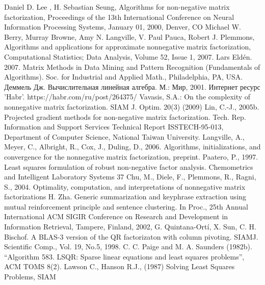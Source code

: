 \newpage
{}

\begin{thebibliography}{9}
   Daniel D. Lee , H. Sebastian Seung, Algorithms for non-negative matrix factorization, Proceedings of the 13th International Conference on Neural Information Processing Systems, January 01, 2000, Denver, CO
   Michael W. Berry, Murray Browne, Amy N. Langville, V. Paul Pauca, Robert J. Plemmons, Algorithms and applications for approximate nonnegative matrix factorization, Computational Statistics; Data Analysis, Volume 52, Issue 1, 2007.
   Lars Eldén. 2007. Matrix Methods in Data Mining and Pattern Recognition (Fundamentals of Algorithms). Soc. for Industrial and Applied Math., Philadelphia, PA, USA.
   Деммель Дж. Вычислительная линейная алгебра. М.: Мир, 2001.
   Интернет ресурс 'Habr'. https://habr.com/ru/post/264375/
   Vavasis, S.A.: On the complexity of nonnegative matrix factorization. SIAM J. Optim. 20(3) (2009)
   Lin, C.-J., 2005b. Projected gradient methods for non-negative matrix factorization. Tech. Rep. Information and Support Services Technical Report ISSTECH-95-013, Department of Computer Science, National Taiwan University.
   Langville, A., Meyer, C., Albright, R., Cox, J., Duling, D., 2006. Algorithms, initializations, and convergence for the nonnegative matrix factorization, preprint.
   Paatero, P., 1997. Least squares formulation of robust non-negative factor analysis. Chemometrics and Intelligent Laboratory Systems 37
   Chu, M., Diele, F., Plemmons, R., Ragni, S., 2004. Optimality, computation, and interpretations of nonnegative matrix factorizations
   H. Zha. Generic summarization and keyphrase extraction using mutual reinforcement principle and sentence clustering. In Proc., 25th Annual International ACM SIGIR Conference on Research and Development in Information Retrieval, Tampere, Finland, 2002,
   G. Quintana-Ortí, X. Sun, C. H. Bischof. A BLAS-3 version of the QR factorizaton with column pivoting. SIAMJ. Scientific Comp., Vol. 19, No.5, 1998.
   C. C. Paige and M. A. Saunders (1982b). “Algorithm 583. LSQR: Sparse linear equations and least squares problems”, ACM TOMS 8(2).
   Lawson C., Hanson R.J., (1987) Solving Least Squares Problems, SIAM
\end{thebibliography}
